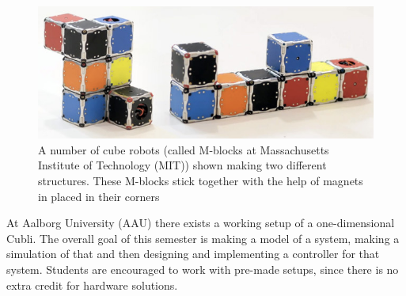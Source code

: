 \begin{figure}[H] 
	\centering 
	\includegraphics[scale=0.4]{figures/m-blocks}
	\caption{A number of cube robots (called M-blocks at Massachusetts Institute of Technology (MIT)) shown making two different structures. These M-blocks stick together with the help of magnets in placed in their corners\cite{LRosen}}
	\label{MBlocksExample}
\end{figure} 
At Aalborg University (AAU) there exists a working setup of a one-dimensional Cubli. The overall goal of this semester is making a model of a system, making a simulation of that and then designing and implementing a controller for that system. Students are encouraged to work with pre-made setups, since there is no extra credit for hardware solutions.






